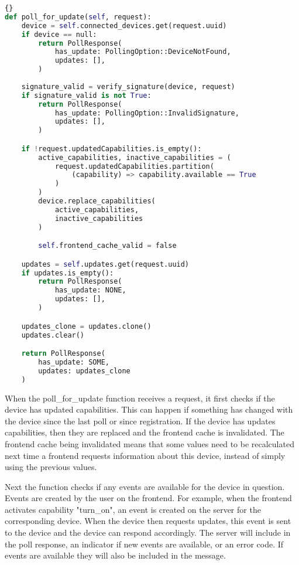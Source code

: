 \begin{lstlisting}[language=Python, style=boxed, showstringspaces=false]{}
def poll_for_update(self, request):
    device = self.connected_devices.get(request.uuid)
    if device == null:
        return PollResponse(
            has_update: PollingOption::DeviceNotFound,
            updates: [],
        )
    
    signature_valid = verify_signature(device, request)
    if signature_valid is not True:
        return PollResponse(
            has_update: PollingOption::InvalidSignature,
            updates: [],
        )

    if !request.updatedCapabilities.is_empty():
        active_capabilities, inactive_capabilities = (
            request.updatedCapabilities.partition(
                (capability) => capability.available == True
            )
        )
        device.replace_capabilities(
            active_capabilities,
            inactive_capabilities
        )

        self.frontend_cache_valid = false

    updates = self.updates.get(request.uuid)
    if updates.is_empty():
        return PollResponse(
            has_update: NONE,
            updates: [],
        )

    updates_clone = updates.clone()
    updates.clear()

    return PollResponse(
        has_update: SOME,
        updates: updates_clone
    )
\end{lstlisting}
When the poll\_for\_update function receives a request, it first checks if the device has updated capabilities. This can happen if something has changed with the device since the last poll or since registration. If the device has updates capabilities, then they are replaced and the frontend cache is invalidated. The frontend cache being invalidated means that some values need to be recalculated next time a frontend requests information about this device, instead of simply using the previous values.

Next the function checks if any events are available for the device in question. Events are created by the user on the frontend. For example, when the frontend activates capability "turn\_on", an event is created on the server for the corresponding device. When the device then requests updates, this event is sent to the device and the device can respond accordingly. The server will include in the poll response, an indicator if new events are available, or an error code. If events are available they will also be included in the message.

